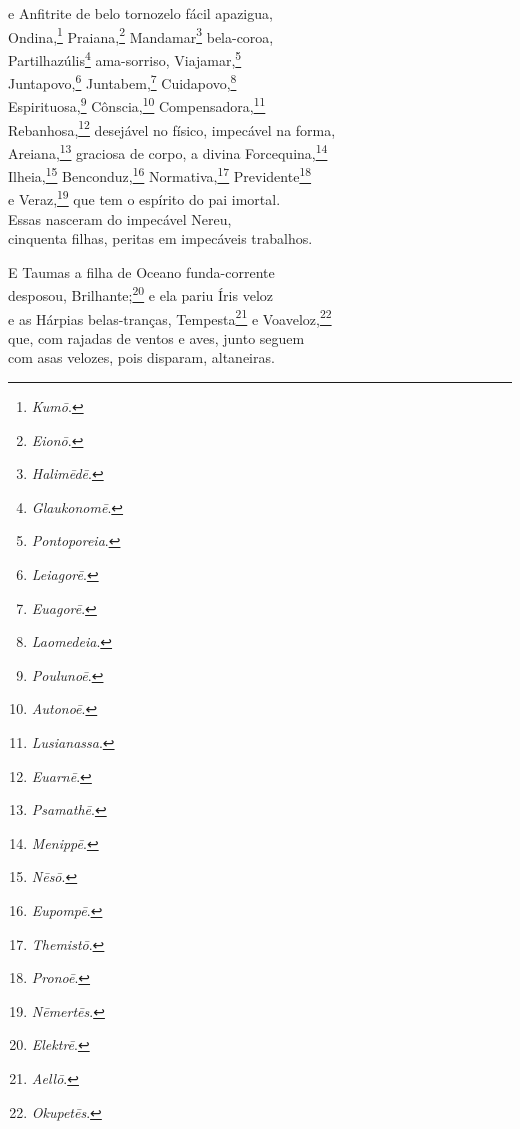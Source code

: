 e Anfitrite de belo tornozelo fácil apazigua,\\
Ondina,\footnote{\emph{Kumō}.} Praiana,\footnote{\emph{Eionō}.} Mandamar\footnote{\emph{Halimēdē}.} bela-coroa, \\
Partilhazúlis\footnote{\emph{Glaukonomē}.} ama-sorriso, Viajamar,\footnote{\emph{Pontoporeia}.}\\
Juntapovo,\footnote{\emph{Leiagorē}.} Juntabem,\footnote{\emph{Euagorē}.} Cuidapovo,\footnote{\emph{Laomedeia}.}\\
Espirituosa,\footnote{\emph{Poulunoē}.} Cônscia,\footnote{\emph{Autonoē}.} Compensadora,\footnote{\emph{Lusianassa}.}\\
Rebanhosa,\footnote{\emph{Euarnē}.} desejável no físico, impecável na forma,\\
Areiana,\footnote{\emph{Psamathē}.} graciosa de corpo, a divina Forcequina,\footnote{\emph{Menippē}.} \\
Ilheia,\footnote{\emph{Nēsō}.} Benconduz,\footnote{\emph{Eupompē}.} Normativa,\footnote{\emph{Themistō}.} Previdente\footnote{\emph{Pronoē}.}\\
e Veraz,\footnote{\emph{Nēmertēs}.} que tem o espírito do pai imortal.\\
Essas nasceram do impecável Nereu,\\
cinquenta filhas, peritas em impecáveis trabalhos.

\quad{}E Taumas a filha de Oceano funda-corrente \\
desposou, Brilhante;\footnote{\emph{Elektrē}.} e ela pariu Íris veloz\\
e as Hárpias belas-tranças, Tempesta\footnote{\emph{Aellō}.} e Voaveloz,\footnote{\emph{Okupetēs}.}\\
que, com rajadas de ventos e aves, junto seguem\\
com asas velozes, pois disparam, altaneiras.

